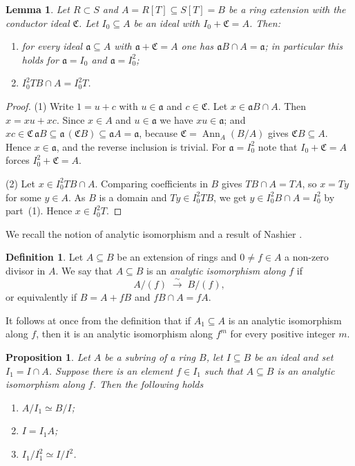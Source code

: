 \documentclass[11pt,reqno]{amsart}
\theoremstyle{plain}
\newtheorem{proposition}[theorem]{Proposition}
\newtheorem{lemma}[theorem]{Lemma}
\theoremstyle{definition}
\newtheorem{definition}[theorem]{Definition}
\newcommand{\CC}{\mathfrak{C}}
\begin{document}
\begin{lemma}\label{lem:contract}
Let $R\subset S$ and $A=R[T]\subseteq S[T]=B$ be a ring extension with the conductor ideal $\CC$.
Let $I_0\subseteq A$ be an ideal with $I_0+\CC=A$. Then:
\begin{enumerate}
  \item for every ideal $\mathfrak{a}\subseteq A$ with $\mathfrak{a}+\CC=A$ one has
        $\mathfrak{a}B\cap A=\mathfrak{a}$; in particular this holds for
        $\mathfrak{a}=I_0$ and $\mathfrak{a}=I_0^2$;
  \item $I_0^2TB\cap A=I_0^2T$.
\end{enumerate}
\end{lemma}

\begin{proof}
(1) Write $1=u+c$ with $u\in\mathfrak{a}$ and $c\in \CC$. Let
$x\in\mathfrak{a}B\cap A$. Then $x=xu+xc$. Since $x\in A$ and
$u\in\mathfrak{a}$ we have $xu\in\mathfrak{a}$; and
$xc\in \CC\,\mathfrak{a}B\subseteq\mathfrak{a}\,(\CC B)\subseteq\mathfrak{a}A
=\mathfrak{a}$, because $\CC=\operatorname{Ann}_A(B/A)$ gives $
\CC B\subseteq A$.
Hence $x\in\mathfrak{a}$, and the reverse inclusion is trivial. For
$\mathfrak{a}=I_0^2$ note that $I_0+\CC=A$ forces $I_0^2+\CC=A$.

(2) Let $x\in I_0^2TB\cap A$. Comparing coefficients in $B$ gives
$TB\cap A=TA$, so $x=Ty$ for some $y\in A$. As $B$ is a domain and
$Ty\in I_0^2TB$, we get $y\in I_0^2B\cap A=I_0^2$ by part~(1). Hence
$x\in I_0^2T$.
\end{proof}
We recall the notion  of analytic isomorphism and a result of Nashier \cite[Proposition 1.3]{Nas83}.

\begin{definition}\label{def:analytic}
Let $A\subseteq B$ be an extension of rings and $0\neq f\in A$ a non-zero divisor in $A$. We say that $A\subseteq B$ is an
\emph{analytic isomorphism along $f$} if
\[
A/(f)\;\xrightarrow{\ \sim\ }\;B/(f),
\]
or equivalently if $B=A+fB$ and $fB\cap A=fA$.
\end{definition}

It follows at once from the definition that if $A_1\subseteq A$ is an analytic isomorphism
along $f$, then it is an analytic isomorphism along $f^m$ for every positive integer $m$.

\begin{proposition}\label{prop:nashier}
Let $A$ be a subring of a ring $B$, let $I\subseteq B$ be an ideal and set $I_1=I\cap A$.
Suppose there is an element $f\in I_1$ such that $A\subseteq B$ is an analytic isomorphism
along $f$. Then the following holds
\begin{enumerate}
\item $A/I_1\simeq B/I$;
\item $I=I_1A$;
\item $I_1/I_1^2\simeq I/I^2$.
\end{enumerate}
\end{proposition}
\end{document}
